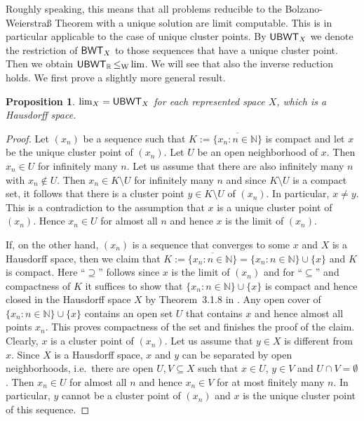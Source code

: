\documentclass[a4paper]{amsart}
\def\IN{{\mathbb{N}}}
\def\IR{{\mathbb{R}}}
\def\In{\subseteq}
\def\BWT{\text{\rm\sffamily BWT}}
\def\UBWT{\text{\rm\sffamily UBWT}}
\def\leqW{\mathop{\leq_{\mathrm{W}}}}
\newtheorem{proposition}[theorem]{Proposition}
\theoremstyle{definition}
\begin{document}
Roughly speaking, this means that all problems reducible to the Bolzano-Weier\-stra\ss{} Theorem
with a unique solution are limit computable.
This is in particular applicable to the case of unique cluster points. 
By $\UBWT_X$ we denote the restriction of $\BWT_X$ to those sequences
that have a unique cluster point. Then we obtain $\UBWT_\IR\leqW\lim$.
We will see that also the inverse reduction holds. We first prove a slightly
more general result.

\begin{proposition}
\label{prop:unique-BWT}
$\lim_X=\UBWT_X$ for each represented space $X$, which is a Hausdorff space.
\end{proposition}
\begin{proof}
Let $(x_n)$ be a sequence such that $K:=\overline{\{x_n:n\in\IN\}}$ is compact
and let $x$ be the unique cluster point of $(x_n)$. Let $U$ be an open neighborhood 
of $x$. Then $x_n\in U$ for infinitely many $n$. Let us assume that there are also
infinitely many $n$ with $x_n\not\in U$. Then $x_n\in K\setminus U$ for infinitely many $n$ 
and since $K\setminus U$ is a compact set, it follows that there is a cluster point $y\in K\setminus U$ of $(x_n)$.
In particular, $x\not =y$.  
This is a contradiction to the assumption that $x$ is a unique cluster point of $(x_n)$.
Hence $x_n\in U$ for almost all $n$ and hence $x$ is the limit of $(x_n)$. 

If, on the other hand, $(x_n)$ is a sequence that converges to some $x$
and $X$ is a Hausdorff space, then we claim that $K:=\overline{\{x_n:n\in\IN\}}=\{x_n:n\in\IN\}\cup\{x\}$ and $K$ is compact. 
Here ``$\supseteq$'' follows since $x$ is the limit of $(x_n)$ and for ``$\In$'' and compactness of $K$
it suffices to show that $\{x_n:n\in\IN\}\cup\{x\}$ is compact and hence closed
in the Hausdorff space $X$ by Theorem~3.1.8 in \cite{Eng89}.
Any open cover of $\{x_n:n\in\IN\}\cup\{x\}$ contains an open set $U$ that contains $x$
and hence almost all points $x_n$. This proves compactness of the set and finishes the proof of the claim.
Clearly, $x$ is a cluster point of $(x_n)$. Let us assume that $y\in X$ is different from $x$.
Since $X$ is a Hausdorff space, $x$ and $y$ can be separated by open neighborhoods, i.e.\ there
are open $U,V\In X$ such that $x\in U$, $y\in V$ and $U\cap V=\emptyset$. Then $x_n\in U$
for almost all $n$ and hence $x_n\in V$ for at most finitely many $n$. In particular, $y$ cannot
be a cluster point of $(x_n)$ and $x$ is the unique cluster point of this sequence. 
\end{proof}
\end{document}

